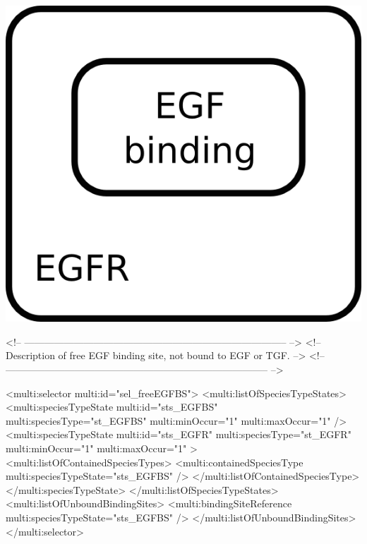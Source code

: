 \includegraphics{figs/pngs/sel_freeEGFBS.png}

\begin{example}
<!-- -------------------------------------------------------------------------------- -->
<!-- Description of free EGF binding site, not bound to EGF or TGF.                   -->
<!-- -------------------------------------------------------------------------------- -->

      <multi:selector multi:id="sel_freeEGFBS">
        <multi:listOfSpeciesTypeStates>
          <multi:speciesTypeState multi:id="sts_EGFBS" multi:speciesType="st_EGFBS" 
                                   multi:minOccur="1" multi:maxOccur="1" />
          <multi:speciesTypeState multi:id="sts_EGFR" multi:speciesType="st_EGFR" 
                                   multi:minOccur="1" multi:maxOccur="1" >
            <multi:listOfContainedSpeciesTypes>
              <multi:containedSpeciesType multi:speciesTypeState="sts_EGFBS" /> 
            </multi:listOfContainedSpeciesType>            
          </multi:speciesTypeState>
        </multi:listOfSpeciesTypeStates>
        <multi:listOfUnboundBindingSites>
          <multi:bindingSiteReference multi:speciesTypeState="sts_EGFBS" />
        </multi:listOfUnboundBindingSites>
      </multi:selector>
\end{example}

